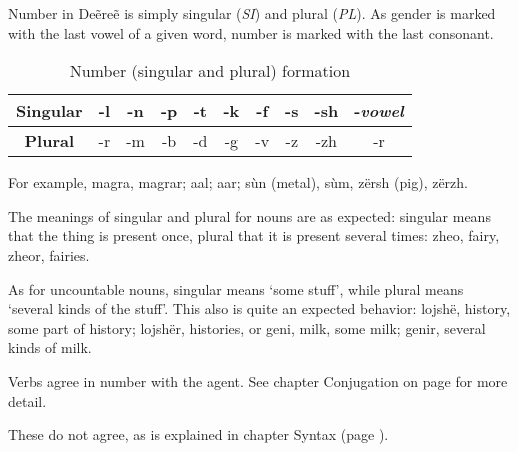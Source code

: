 Number in Deẽreẽ is simply singular (\emph{SI}) and plural (\emph{PL}). As gender is marked with the
last vowel of a given word, number is marked with the last consonant.

\begin{table}[h]\label{tab:morph-number}
\begin{center}
\begin{tabular}{|c|ccccccccc|}
\hline
\textbf{Singular} & -l & -n & -p & -t & -k & -f & -s & -sh & -\emph{vowel}\\\hline
\textbf{Plural}   & -r & -m & -b & -d & -g & -v & -z & -zh & -r\\\hline
\end{tabular}
\end{center}
\caption{Number (singular and plural) formation}
\end{table}

For example, magra, magrar; aal; aar; \gls{sùn} (metal), sùm, 
\gls{zërsh} (pig), zërzh.

The meanings of singular and plural for nouns are as expected: singular means that the thing is
present once, plural that it is present several times: \gls{zheo}, fairy,
\gls{zheo}r, fairies.

As for uncountable nouns, singular means ‘some stuff’, while plural means ‘several kinds of the
stuff’. This also is quite an expected behavior: \gls{lojshë}, history,
some part of history; \gls{lojshë}r, histories, or \gls{geni}, milk, some milk;
\gls{geni}r, several kinds of milk.

Verbs agree in number with the agent. See chapter Conjugation on page \pageref{chap:conjugation} for
more detail.

These do not agree, as is explained in chapter Syntax (page \pageref{chap:syntax}).

